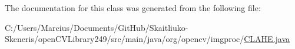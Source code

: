 The documentation for this class was generated from the following file\+:\begin{DoxyCompactItemize}
\item 
C\+:/\+Users/\+Marcius/\+Documents/\+Git\+Hub/\+Skaitliuko-\/\+Skeneris/open\+C\+V\+Library249/src/main/java/org/opencv/imgproc/\mbox{\hyperlink{_c_l_a_h_e_8java}{C\+L\+A\+H\+E.\+java}}\end{DoxyCompactItemize}
